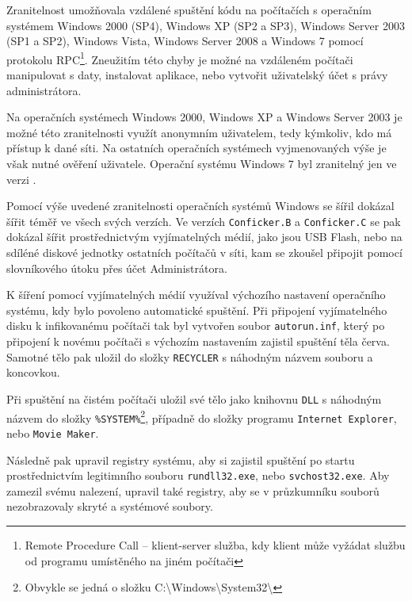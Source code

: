 \documentclass[a4paper,12pt]{article}
\begin{document}
Zranitelnost umožňovala vzdálené spuštění kódu na počítačích s operačním systémem Windows 2000 (SP4), Windows XP (SP2 a SP3), Windows Server 2003 (SP1 a SP2), Windows Vista, Windows Server 2008 a Windows 7 pomocí protokolu RPC\footnote{Remote Procedure Call -- klient-server služba, kdy klient může vyžádat službu od programu umístěného na jiném počítači}. Zneužitím této chyby je možné na vzdáleném počítači manipulovat s daty, instalovat aplikace, nebo vytvořit uživatelský účet s právy administrátora.\cite{conficker-ms}\cite{conficker-malwarebytes}

Na operačních systémech Windows 2000, Windows XP a Windows Server 2003 je možné této zranitelnosti využít anonymním uživatelem, tedy kýmkoliv, kdo má přístup k dané síti. Na ostatních operačních systémech vyjmenovaných výše je však nutné ověření uživatele. Operační systému Windows 7 byl zranitelný jen ve verzi .\cite{conficker-ms}

Pomocí výše uvedené zranitelnosti operačních systémů Windows se šířil dokázal šířit téměř ve všech svých verzích. Ve verzích \texttt{Conficker.B} a \texttt{Conficker.C} se pak dokázal šířit prostřednictvým vyjímatelných médií, jako jsou USB Flash, nebo na sdíléné diskové jednotky ostatních počítačů v síti, kam se zkoušel připojit pomocí slovníkového útoku přes účet Administrátora.\cite{conficker-wiki}\cite{conficker-trendmicro}\cite{conficker-fsecure}

K šíření pomocí vyjímatelných médií využíval výchozího nastavení operačního systému, kdy bylo povoleno automatické spuštění. Při připojení vyjímatelného disku k infikovanému počítači tak byl vytvořen soubor \texttt{autorun.inf}, který po připojení k novému počítači s výchozím nastavením zajistil spuštění těla červa. Samotné tělo pak uložil do složky \texttt{RECYCLER} s náhodným názvem souboru a koncovkou.\cite{conficker-trendmicro}

Při spuštění na čistém počítači uložil své tělo jako knihovnu \texttt{DLL} s náhodným názvem do složky \texttt{\%SYSTEM\%}\footnote{Obvykle se jedná o složku C:\textbackslash Windows\textbackslash System32\textbackslash}, případně do složky programu \texttt{Internet Explorer}, nebo \texttt{Movie Maker}.\cite{conficker-trendmicro}

Následně pak upravil registry systému, aby si zajistil spuštění po startu prostřednictvím legitimního souboru \texttt{rundll32.exe}, nebo \texttt{svchost32.exe}. Aby zamezil svému nalezení, upravil také registry, aby se v průzkumníku souborů nezobrazovaly skryté a systémové soubory.\cite{conficker-trendmicro}
\end{document}
